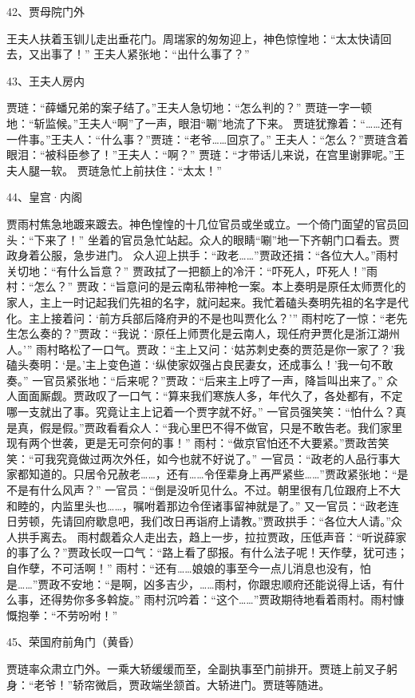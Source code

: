 42、贾母院门外\par
王夫人扶着玉钏儿走出垂花门。周瑞家的匆匆迎上，神色惊惶地：“太太快请回去，又出事了！”
王夫人紧张地：“出什么事了？”

43、王夫人房内\par
贾琏：“薛蟠兄弟的案子结了。”王夫人急切地：“怎么判的？”
贾琏一字一顿地：“斩监候。”王夫人“啊”了一声，眼泪“唰”地流了下来。
贾琏犹豫着：“……还有一件事。”王夫人：“什么事？”贾琏：“老爷……回京了。”
王夫人：“怎么？”贾琏含着眼泪：“被科臣参了！”王夫人：“啊？”
贾琏：“才带话儿来说，在宫里谢罪呢。”王夫人腿一软。
贾琏急忙上前扶住：“太太！”

44、皇宫·内阁\par
贾雨村焦急地踱来踱去。神色惶惶的十几位官员或坐或立。一个倚门面望的官员回头：“下来了！”
坐着的官员急忙站起。众人的眼睛“唰”地一下齐朝门口看去。贾政身着公服，急步进门。
众人迎上拱手：“政老……”贾政还揖：“各位大人。”雨村关切地：“有什么旨意？”
贾政拭了一把额上的冷汗：“吓死人，吓死人！”雨村：“怎么？”
贾政：“旨意问的是云南私带神枪一案。本上奏明是原任太师贾化的家人，主上一时记起我们先祖的名字，就问起来。我忙着磕头奏明先祖的名字是代化。主上接着问：‘前方兵部后降府尹的不是也叫贾化么？’”
雨村吃了一惊：“老先生怎么奏的？”贾政：“我说：‘原任上师贾化是云南人，现任府尹贾化是浙江湖州人。’”
雨村略松了一口气。贾政：“主上又问：‘姑苏刺史奏的贾范是你一家了？’我磕头奏明：‘是。’主上变色道：‘纵使家奴强占良民妻女，还成事么！’我一句不敢奏。”
一官员紧张地：“后来呢？”贾政：“后来主上哼了一声，降旨叫出来了。”
众人面面厮觑。贾政叹了一口气：“算来我们寒族人多，年代久了，各处都有，不定哪一支就出了事。究竟让主上记着一个贾字就不好。”
一官员强笑笑：“怕什么？真是真，假是假。”贾政看看众人：“我心里巴不得不做官，只是不敢告老。我们家里现有两个世袭，更是无可奈何的事！”
雨村：“做京官怕还不大要紧。”贾政苦笑笑：“可我究竟做过两次外任，如今也就不好说了。”
一官员：“政老的人品行事大家都知道的。只居令兄赦老……，还有……令侄辈身上再严紧些……”贾政紧张地：“是不是有什么风声？”
一官员：“倒是没听见什么。不过。朝里很有几位跟府上不大和睦的，内监里头也……，嘱咐着那边令侄诸事留神就是了。”
又一官员：“政老连日劳顿，先请回府歇息吧，我们改日再诣府上请教。”贾政拱手：“各位大人请。”众人拱手离去。
雨村觑着众人走出去，趋上一步，拉拉贾政，压低声音：“听说薛家的事了么？”贾政长叹一口气：“路上看了邸报。有什么法子呢！天作孽，犹可违；自作孽，不可活啊！”
雨村：“还有……娘娘的事至今一点儿消息也没有，怕是……”贾政不安地：“是啊，凶多吉少，……雨村，你跟忠顺府还能说得上话，有什么事，还得势你多多斡旋。”
雨村沉吟着：“这个……”贾政期待地看着雨村。雨村慷慨抱拳：“不劳吩咐！”

45、荣国府前角门（黄昏）\par
贾琏率众肃立门外。一乘大轿缓缓而至，全副执事至门前排开。贾琏上前叉子躬身：“老爷！”轿帘微启，贾政端坐颔首。大轿进门。贾琏等随进。

